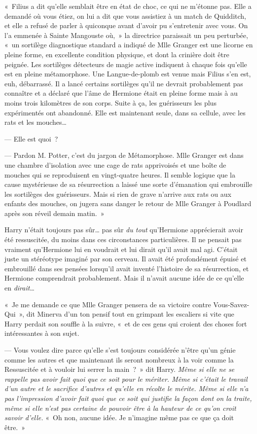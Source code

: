 «~Filius a dit qu'elle semblait être en état de choc, ce qui ne m'étonne pas.
Elle a demandé où vous étiez, on lui a dit que vous assistiez à un match de Quidditch, et elle a refusé de parler à quiconque avant d'avoir pu s'entretenir avec vous.
On l'a emmenée à Sainte Mangouste où,~» la directrice paraissait un peu perturbée, «~un sortilège diagnostique standard a indiqué de Mlle Granger est une licorne en pleine forme, en excellente condition physique, et dont la crinière doit être peignée.
Les sortilèges détecteurs de magie active indiquent à chaque fois qu'elle est en pleine métamorphose.
Une Langue-de-plomb est venue mais Filius s'en est, euh, débarrassé.
Il a lancé certains sortilèges qu'il ne devrait probablement pas connaître et a déclaré que l'âme de Hermione était en pleine forme mais à au moins trois kilomètres de son corps.
Suite à ça, les guérisseurs les plus expérimentés ont abandonné.
Elle est maintenant seule, dans sa cellule, avec les rats et les mouches…

--- Elle est quoi~?

--- Pardon M. Potter, c'est du jargon de Métamorphose.
Mlle Granger est dans une chambre d'isolation avec une cage de rats apprivoisés et une boîte de mouches qui se reproduisent en vingt-quatre heures.
Il semble logique que la cause mystérieuse de sa résurrection a laissé une sorte d'émanation qui embrouille les sortilèges des guérisseurs.
Mais si rien de grave n'arrive aux rats ou aux enfants des mouches, on jugera sans danger le retour de Mlle Granger à Poudlard après son réveil demain matin.~»

Harry n'était toujours pas sûr… pas sûr \emph{du tout} qu'Hermione apprécierait avoir été ressuscitée, du moins dans ces circonstances particulières.
Il ne pensait pas vraiment qu'Hermione lui en voudrait et lui dirait qu'il avait mal agi.
C'était juste un stéréotype imaginé par son cerveau.
Il avait été profondément épuisé et embrouillé dans ses pensées lorsqu'il avait inventé l'histoire de sa résurrection, et Hermione comprendrait probablement.
Mais il n'avait aucune idée de ce qu'elle en \emph{dirait}…

«~Je me demande ce que Mlle Granger pensera de sa victoire contre Vous-Savez-Qui~», dit Minerva d'un ton pensif tout en grimpant les escaliers si vite que Harry perdait son souffle à la suivre, «~et de ces gens qui croient des choses fort intéressantes à son sujet.

--- Vous voulez dire parce qu'elle s'est toujours considérée n'être qu'un génie comme les autres et que maintenant ils seront nombreux à la voir comme la Ressuscitée et à vouloir lui serrer la main~?~»
dit Harry.
\emph{Même si elle ne se rappelle pas avoir fait quoi que ce soit pour le mériter.
Même si c'était le travail d'un autre et le sacrifice d'autres et qu'elle en récolte le mérite.
Même si elle n'a pas l'impression d'avoir fait quoi que ce soit qui justifie la façon dont on la traite, même si elle n'est pas certaine de pouvoir être à la hauteur de ce qu'on croit savoir d'elle.} «~Oh non, aucune idée.
Je n'imagine même pas ce que ça doit être.~»

